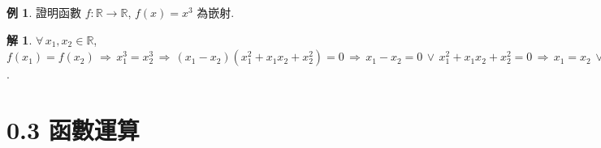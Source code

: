 \documentclass[12pt]{extarticle}
\newcommand{\ds}{\displaystyle}
\newcommand{\ie}{\,\Longrightarrow\,}
\theoremstyle{definition}
\newtheorem*{ex}{例}
\newtheorem*{sol}{解}
\begin{document}
\begin{ex}
  證明函數 $f:\mathbb{R}\to\mathbb{R}$, $f(x) = x^3$ 為嵌射. 
\end{ex}

\begin{sol}
  $\forall\,x_1, x_2\in\mathbb{R}$, $\ds f(x_1) = f(x_2) \ie x_1^3 = x_2^3 \ie (x_1 - x_2)(x_1^2 + x_1 x_2 + x_2^2) = 0 \ie x_1 - x_2 = 0\,\vee\, x_1^2 + x_1 x_2 + x_2^2 = 0 \ie x_1 = x_2\,\vee\,\Big(x_1 + \frac{x_2}{2}\Big)^2 + \frac{3x_2^2}{4} = 0 \ie x_1 = x_2\,\vee\, \Big(x_2 = 0 \,\wedge\, x_1 + \frac{x_2}{2} = 0\Big) \ie x_1 = x_2\,\vee\, x_2 = x_1 = 0 \ie x_1 = x_2$.  
\end{sol}

%

\section*{0.3 函數運算}
\end{document}
